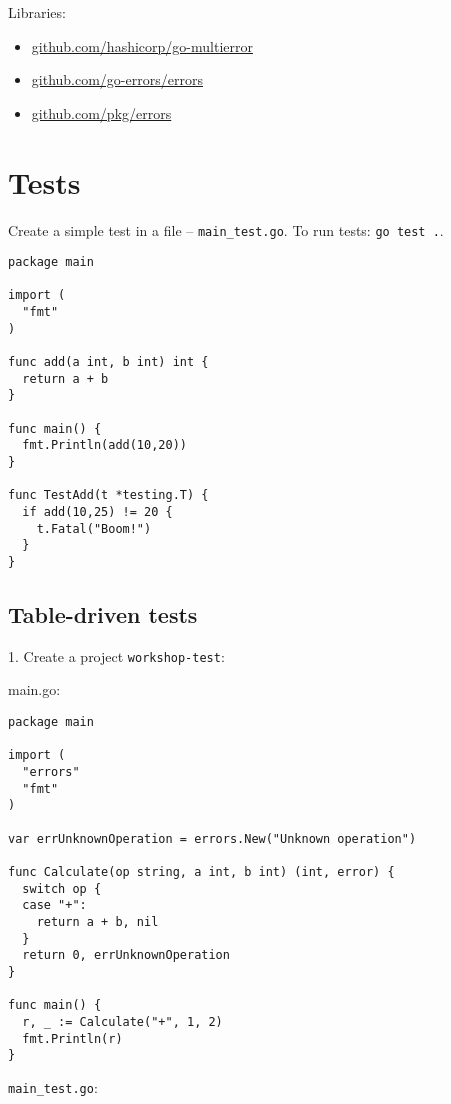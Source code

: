 \documentclass[11pt, letterpaper]{article}
\begin{document}
\bigskip

Libraries:

\begin{itemize}
\item \href{https://github.com/hashicorp/go-multierror}{github.com/hashicorp/go-multierror}
\item \href{https://github.com/go-errors/errors}{github.com/go-errors/errors}
\item \href{https://github.com/pkg/errors}{github.com/pkg/errors}
\end{itemize}

\pagebreak
\section{Tests}

Create a simple test in a file -- \texttt{main_test.go}. To run tests: \texttt{go test .}.

\begin{verbatim}
package main

import (
  "fmt"
)

func add(a int, b int) int {
  return a + b
}

func main() {
  fmt.Println(add(10,20))
}

func TestAdd(t *testing.T) {
  if add(10,25) != 20 {
    t.Fatal("Boom!")
  }
}
\end{verbatim}

\pagebreak
\subsection{Table-driven tests}

1. Create a project \verb|workshop-test|:

main.go:

\begin{verbatim}
package main

import (
  "errors"
  "fmt"
)

var errUnknownOperation = errors.New("Unknown operation")

func Calculate(op string, a int, b int) (int, error) {
  switch op {
  case "+":
    return a + b, nil
  }
  return 0, errUnknownOperation
}

func main() {
  r, _ := Calculate("+", 1, 2)
  fmt.Println(r)
}
\end{verbatim}

\verb|main_test.go|:
\end{document}
